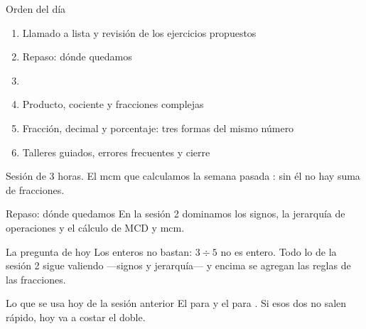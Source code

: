 \documentclass[aspectratio=169,10pt]{beamer}
\begin{document}
\portada

\begin{frame}{Orden del día}
  \begin{enumerate}
    \item Llamado a lista y revisión de los ejercicios propuestos
    \item Repaso: dónde quedamos
    \item {}
    \item Producto, cociente y fracciones complejas
    \item Fracción, decimal y porcentaje: tres formas del mismo número
    \item Talleres guiados, errores frecuentes y cierre
  \end{enumerate}

  \vspace{0.25cm}
  {\footnotesize\color{uniGris} Sesión de 3 horas. El mcm que calculamos la
  semana pasada : sin él no hay
  suma de fracciones.}
\end{frame}

\begin{frame}{Repaso: dónde quedamos}
  \footnotesize
  En la sesión 2 dominamos los signos, la jerarquía de operaciones y el cálculo
  de MCD y mcm.

  \vspace{0.2cm}
  \begin{alertblock}{La pregunta de hoy}
    \footnotesize
    Los enteros no bastan: $3 \div 5$ no es entero.  Todo lo de la sesión 2 sigue
    valiendo —signos y jerarquía— y encima se agregan las reglas de las
    fracciones.
  \end{alertblock}

  \vspace{0.2cm}
  \begin{block}{Lo que se usa hoy de la sesión anterior}
    \footnotesize
    El  para  y el  para
    . Si esos dos no salen rápido, hoy va a costar el
    doble.
  \end{block}
\end{frame}

\end{document}
